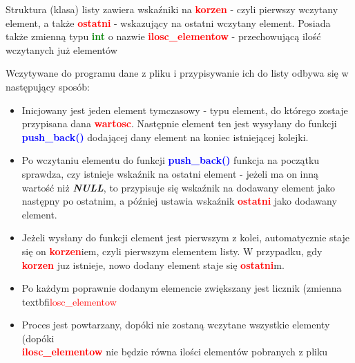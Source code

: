 \documentclass[12pt,a4paper,oneside]{article}
\begin{document}
Struktura (klasa) listy zawiera wskaźniki na \textbf{\textcolor{red}{korzen}} - czyli pierwszy wczytany element, a także \textbf{\textcolor{red}{ostatni}} - wskazujący na ostatni wczytany element. Posiada także zmienną typu \textbf{\textcolor{green}{int}} o nazwie \textbf{\textcolor{red}{ilosc\_elementow}} - przechowującą ilość wczytanych już elementów

Wczytywane do programu dane z pliku i przypisywanie ich do listy odbywa się w następujący sposób:
\begin{itemize}
	\item Inicjowany jest jeden element tymczasowy - typu element, do którego zostaje przypisana dana \textbf{\textcolor{red}{wartosc}}. Następnie element ten jest wysyłany do funkcji \textbf{\textcolor{blue}{push\_back()}} dodającej dany element na koniec istniejącej kolejki.
	\item Po wczytaniu elementu do funkcji \textbf{\textcolor{blue}{push\_back()}} funkcja na początku sprawdza, czy istnieje wskaźnik na ostatni element - jeżeli ma on inną wartość niż \textbf{\textit{NULL}}, to przypisuje się wskaźnik na dodawany element jako następny po ostatnim, a później ustawia wskaźnik \textbf{\textcolor{red}{ostatni}} jako dodawany element.
	\item Jeżeli wysłany do funkcji element jest pierwszym z kolei, automatycznie staje się on \textbf{\textcolor{red}{korzen}}iem, czyli pierwszym elementem listy. W przypadku, gdy \textbf{\textcolor{red}{korzen}} juz istnieje, nowo dodany element staje się \textbf{\textcolor{red}{ostatni}}m.
	\item Po każdym poprawnie dodanym elemencie zwiększany jest licznik (zmienna \\{textbf\textcolor{red}{ilosc\_elementow}}
	\item Proces jest powtarzany, dopóki nie zostaną wczytane wszystkie elementy (dopóki \\\textbf{\textcolor{red}{ilosc\_elementow}} nie będzie równa ilości elementów pobranych z pliku
\end{itemize}
\end{document}
